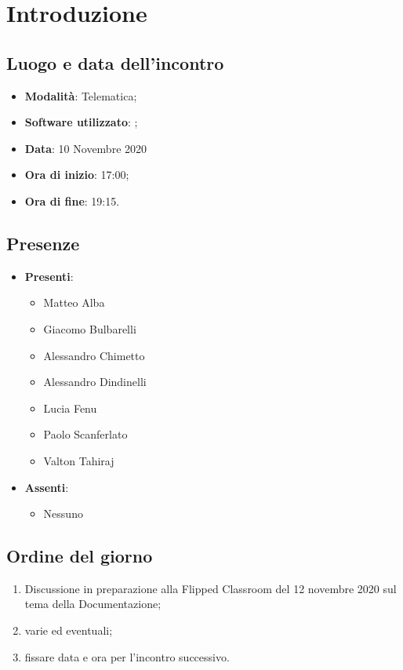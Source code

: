 \documentclass[]{article}
\begin{document}
	
	
	
	\newpage
	
	\section{Introduzione}
		\subsection{Luogo e data dell'incontro}
		\begin{itemize}
			\item \textbf{Modalità}: Telematica;
			\item \textbf{Software utilizzato}: ;
			\item \textbf{Data}: 10 Novembre 2020
			\item \textbf{Ora di inizio}: 17:00;
			\item \textbf{Ora di fine}: 19:15.
		\end{itemize}
		
		\subsection{Presenze}
		\begin{itemize}
			\item \textbf{Presenti}: 
			\begin{itemize}
				\item Matteo Alba
				\item Giacomo Bulbarelli
				\item Alessandro Chimetto
				\item Alessandro Dindinelli
				\item Lucia Fenu
				\item Paolo Scanferlato
				\item Valton Tahiraj
			\end{itemize}
			\item \textbf{Assenti}:
			\begin{itemize}
				\item Nessuno
			\end{itemize}
		\end{itemize}
		
		\subsection{Ordine del giorno}
		\begin{enumerate}
			\item Discussione in preparazione alla Flipped Classroom del 12 novembre 2020 sul tema della Documentazione;
			\item varie ed eventuali;
			\item fissare data e ora per l'incontro successivo.
		\end{enumerate}
\end{document}
